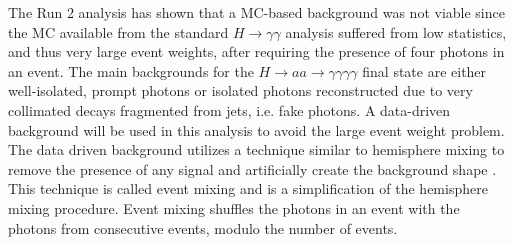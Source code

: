 \documentclass[12pt]{article}
\begin{document}
The Run 2 analysis has shown that a MC-based background was not viable since the MC available from the standard $H \rightarrow \gamma\gamma$ analysis
suffered from low statistics, and thus very large event weights, after requiring the presence of four photons in an event. The main backgrounds for the $H \rightarrow aa \rightarrow \gamma\gamma\gamma\gamma$ final state are either well-isolated, prompt photons or isolated photons reconstructed due to very collimated decays fragmented from jets, i.e. fake photons. A data-driven background will be used in this analysis to avoid the large event weight problem. The data driven background utilizes a technique similar to hemisphere mixing to remove the presence of any signal and artificially create the background shape \cite{hemisphere_mixing}. This technique is called event mixing and is a simplification of the hemisphere mixing procedure.
Event mixing shuffles the photons in an event with the photons from consecutive events, modulo the number of events.\par

\end{document}
